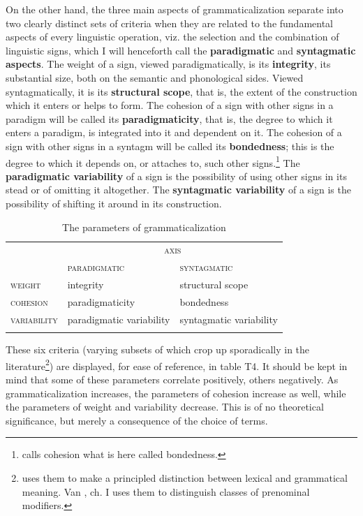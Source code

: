 On the other hand, the three main aspects of grammaticalization separate into two clearly distinct sets of criteria when they are related to the fundamental aspects of every linguistic operation, viz. the selection and the combination of linguistic signs, which I will henceforth call the \textbf{paradigmatic} and \textbf{syntagmatic aspects}. The weight of a sign, viewed paradigmatically, is its \textbf{integrity}, its substantial size, both on the semantic and phonological sides. Viewed syntagmatically, it is its \textbf{structural scope}, that is, the extent of the construction which it enters or helps to form. The cohesion of a sign with other signs in a paradigm will be called its \textbf{paradigmaticity}, that is, the degree to which it enters a paradigm, is integrated into it and dependent on it. The cohesion of a sign with other signs in a syntagm will be called its \textbf{bondedness}; this is the degree to which it depends on, or attaches to, such other signs.\footnote{\citet[8]{Bazell1949} calls cohesion what is here called bondedness.} The \textbf{paradigmatic variability} of a sign is the possibility of using other signs in its stead or of omitting it altogether. The \textbf{syntagmatic variability} of a sign is the possibility of shifting it around in its construction.

\begin{table}
\begin{tabular}{lll}
\lsptoprule
 \multirow{2}{*}{\scshape paramater} & \multicolumn{2}{c}{\scshape axis}\\ \cmidrule{2-3}
 
& \scshape paradigmatic & \scshape syntagmatic\\
\midrule
\scshape weight & integrity & structural scope\\
\scshape cohesion & paradigmaticity & bondedness\\
\scshape variability & paradigmatic variability & syntagmatic variability\\
\lspbottomrule
\end{tabular}
\caption{The parameters of grammaticalization}\label{T4}
\end{table}

These six criteria (varying subsets of which crop up sporadically in the literature\footnote{\citet[169 ]{Weinreich1963} uses them to make a principled distinction between lexical and grammatical meaning. Van \citet{Roey1974}, ch. I uses them to distinguish classes of prenominal modifiers.}) are displayed, for ease of reference, in table T4. It should be kept in mind that some of these parameters correlate positively, others negatively. As grammaticalization increases, the parameters of cohesion increase as well, while the parameters of weight and variability decrease. This is of no theoretical significance, but merely a consequence of the choice of terms.

